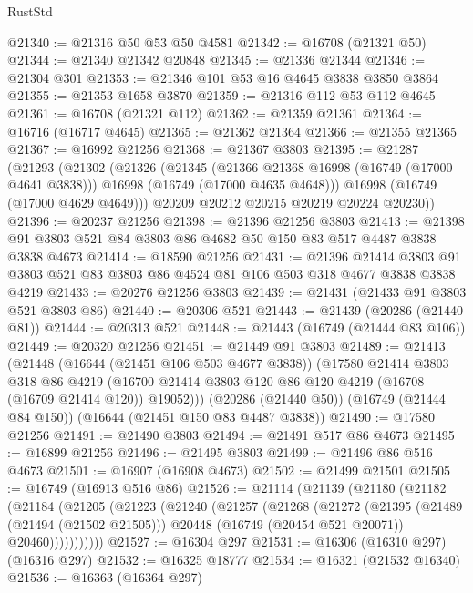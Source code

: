 \begin{lexlean}{RustStd}
\begin{coremodule}
@21340 := @21316 @50 @53 @50 @4581
@21342 := @16708 (@21321 @50)
@21344 := @21340 @21342 @20848
@21345 := @21336 @21344
@21346 := @21304 @301
@21353 := @21346 @101 @53 @16 @4645 @3838 @3850 @3864
@21355 := @21353 @1658 @3870
@21359 := @21316 @112 @53 @112 @4645
@21361 := @16708 (@21321 @112)
@21362 := @21359 @21361
@21364 := @16716 (@16717 @4645)
@21365 := @21362 @21364
@21366 := @21355 @21365
@21367 := @16992 @21256
@21368 := @21367 @3803
@21395 := @21287
    (@21293
      (@21302
        (@21326
          (@21345
            (@21366 @21368 @16998 (@16749 (@17000 @4641 @3838)))
            @16998
            (@16749 (@17000 @4635 @4648)))
          @16998
          (@16749 (@17000 @4629 @4649)))
        @20209
        @20212
        @20215
        @20219
        @20224
        @20230))
@21396 := @20237 @21256
@21398 := @21396 @21256 @3803
@21413 := @21398 @91 @3803 @521 @84 @3803 @86 @4682 @50 @150 @83 @517 @4487 @3838 @3838 @4673
@21414 := @18590 @21256
@21431 := @21396
    @21414
    @3803
    @91
    @3803
    @521
    @83
    @3803
    @86
    @4524
    @81
    @106
    @503
    @318
    @4677
    @3838
    @3838
    @4219
@21433 := @20276 @21256 @3803
@21439 := @21431 (@21433 @91 @3803 @521 @3803 @86)
@21440 := @20306 @521
@21443 := @21439 (@20286 (@21440 @81))
@21444 := @20313 @521
@21448 := @21443 (@16749 (@21444 @83 @106))
@21449 := @20320 @21256
@21451 := @21449 @91 @3803
@21489 := @21413
    (@21448
      (@16644 (@21451 @106 @503 @4677 @3838))
      (@17580
        @21414
        @3803
        @318
        @86
        @4219
        (@16700 @21414 @3803 @120 @86 @120 @4219 (@16708 (@16709 @21414 @120)) @19052)))
    (@20286 (@21440 @50))
    (@16749 (@21444 @84 @150))
    (@16644 (@21451 @150 @83 @4487 @3838))
@21490 := @17580 @21256
@21491 := @21490 @3803
@21494 := @21491 @517 @86 @4673
@21495 := @16899 @21256
@21496 := @21495 @3803
@21499 := @21496 @86 @516 @4673
@21501 := @16907 (@16908 @4673)
@21502 := @21499 @21501
@21505 := @16749 (@16913 @516 @86)
@21526 := @21114
    (@21139
      (@21180
        (@21182
          (@21184
            (@21205
              (@21223
                (@21240
                  (@21257
                    (@21268
                      (@21272
                        (@21395
                          (@21489 (@21494 (@21502 @21505)))
                          @20448
                          (@16749 (@20454 @521 @20071))
                          @20460)))))))))))
@21527 := @16304 @297
@21531 := @16306 (@16310 @297) (@16316 @297)
@21532 := @16325 @18777
@21534 := @16321 (@21532 @16340)
@21536 := @16363 (@16364 @297)

\end{coremodule}
\end{lexlean}
